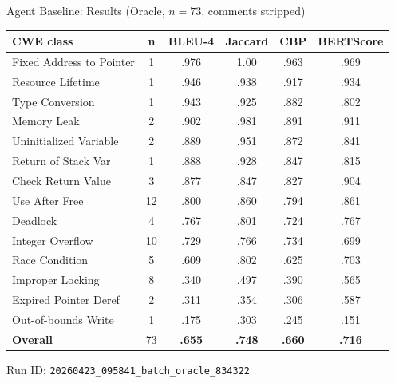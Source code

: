 \documentclass[aspectratio=169,10pt]{beamer}
\newcommand{\chit}[1]{\cellcolor{hit!30} #1}
\newcommand{\cmiss}[1]{\cellcolor{miss!25} #1}
\newcommand{\cwarn}[1]{\cellcolor{warn!30} #1}
\begin{document}
\begin{frame}{Agent Baseline: Results (Oracle, $n{=}73$, comments stripped)}

  \centering
  \vspace{0.2em}
  {\small
  \renewcommand{\arraystretch}{1.1}
  \setlength{\tabcolsep}{4pt}
  \begin{tabular}{l c c c c c}
    \toprule
    \textbf{CWE class} & \textbf{n} & \textbf{BLEU-4} & \textbf{Jaccard} & \textbf{CBP} & \textbf{BERTScore} \\
    \midrule
    \rowcolor{hit!8}
    Fixed Address to Pointer  & 1  & \chit{.976} & \chit{1.00} & \chit{.963} & .969 \\
    Resource Lifetime         & 1  & \chit{.946} & \chit{.938} & \chit{.917} & .934 \\
    Type Conversion           & 1  & \chit{.943} & .925 & .882 & .802 \\
    Memory Leak               & 2  & \chit{.902} & \chit{.981} & .891 & .911 \\
    Uninitialized Variable    & 2  & \chit{.889} & \chit{.951} & .872 & .841 \\
    Return of Stack Var       & 1  & \chit{.888} & .928 & .847 & .815 \\
    Check Return Value        & 3  & \chit{.877} & .847 & .827 & .904 \\
    Use After Free            & 12 & \chit{.800} & .860 & .794 & .861 \\
    \midrule
    Deadlock                  & 4  & .767 & .801 & .724 & .767 \\
    Integer Overflow          & 10 & .729 & .766 & .734 & .699 \\
    Race Condition            & 5  & \cwarn{.609} & .802 & .625 & .703 \\
    Improper Locking          & 8  & \cmiss{.340} & .497 & .390 & .565 \\
    Expired Pointer Deref     & 2  & \cmiss{.311} & .354 & .306 & .587 \\
    Out-of-bounds Write       & 1  & \cmiss{.175} & .303 & .245 & .151 \\
    \midrule
    \rowcolor{c1!8}
    \textbf{Overall}          & 73 & \textbf{.655} & \textbf{.748} & \textbf{.660} & \textbf{.716} \\
    \bottomrule
  \end{tabular}}

  \vspace{0.3em}
  {\scriptsize\color{black!55}
  Run ID: \texttt{20260423\_095841\_batch\_oracle\_834322}}

\end{frame}
\end{document}

